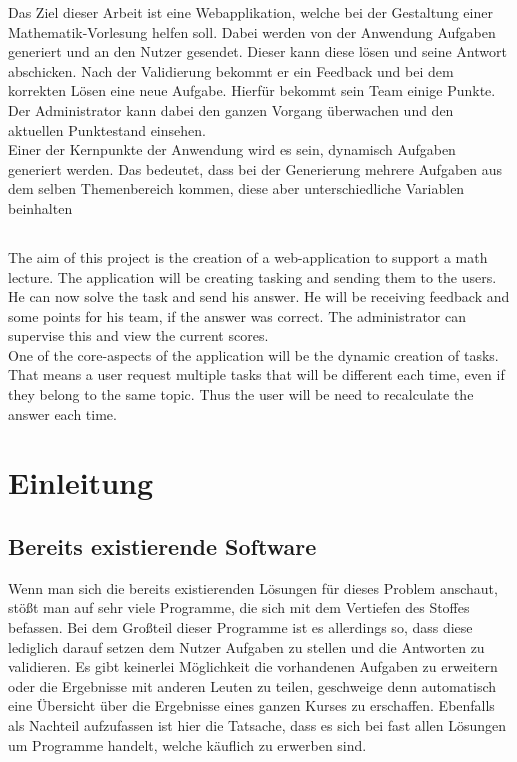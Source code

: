 Das Ziel dieser Arbeit ist eine Webapplikation, welche bei der Gestaltung einer Mathematik-Vorlesung helfen soll. Dabei werden von der Anwendung Aufgaben generiert und an den Nutzer gesendet. Dieser kann diese lösen und seine Antwort abschicken. Nach der Validierung bekommt er ein Feedback und bei dem korrekten Lösen eine neue Aufgabe. Hierfür bekommt sein Team einige Punkte. Der Administrator kann dabei den ganzen Vorgang überwachen und den aktuellen Punktestand einsehen. \\
Einer der Kernpunkte der Anwendung wird es sein, dynamisch Aufgaben generiert werden. Das bedeutet, dass bei der Generierung mehrere Aufgaben aus dem selben Themenbereich kommen, diese aber unterschiedliche Variablen beinhalten \\

\section*{\centering\abstractname}

The aim of this project is the creation of a web-application to support a math lecture. The application will be creating tasking and sending them to the users. He can now solve the task and send his answer. He will be receiving feedback and some points for his team, if the answer was correct. The administrator can supervise this and view the current scores. \\
One of the core-aspects of the application will be the dynamic creation of tasks. That means a user request multiple tasks that will be different each time, even if they belong to the same topic. Thus the user will be need to recalculate the answer each time.



\chapter{Einleitung}

\section{Bereits existierende Software}

Wenn man sich die bereits existierenden Lösungen für dieses Problem anschaut, stößt man auf sehr viele Programme, die sich mit dem Vertiefen des Stoffes befassen. Bei dem Großteil dieser Programme ist es allerdings so, dass diese lediglich darauf setzen dem Nutzer Aufgaben zu stellen und die Antworten zu validieren. Es gibt keinerlei Möglichkeit die vorhandenen Aufgaben zu erweitern oder die Ergebnisse mit anderen Leuten zu teilen, geschweige denn automatisch eine Übersicht über die Ergebnisse eines ganzen Kurses zu erschaffen. Ebenfalls als Nachteil aufzufassen ist hier die Tatsache, dass es sich bei fast allen Lösungen um Programme handelt, welche käuflich zu erwerben sind.\\


